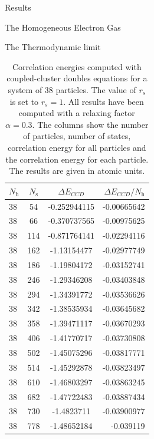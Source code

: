 \documentclass[twoside,english]{uiofysmaster}
\begin{document}
\begin{chapter}{Results}
\begin{section}{The Homogeneous Electron Gas}
\begin{subsection}{The Thermodynamic limit}
			\begin{table}[H]
				\begin{center}
					\begin{tabular}[center]{l c  c r}
						$N_{\text{h}}$ & $N_{\text{s}}$ & $\Delta E_{CCD}$ & $\Delta E_{CCD}/N_{\text{h}}$ \\
						\hline
						38 &  54 & -0.252944115 & -0.00665642\\
						38 &  66 & -0.370737565 & -0.00975625\\
						38 & 114 & -0.871764141 & -0.02294116\\
						38 & 162 & -1.13154477  & -0.02977749\\
						38 & 186 & -1.19804172  & -0.03152741\\
						38 & 246 & -1.29346208  & -0.03403848\\
						38 & 294 & -1.34391772  & -0.03536626\\
						38 & 342 & -1.38535934  & -0.03645682\\
						38 & 358 & -1.39471117  & -0.03670293\\
						38 & 406 & -1.41770717  & -0.03730808\\
						38 & 502 & -1.45075296  & -0.03817771\\
						38 & 514 & -1.45292878  & -0.03823497\\
						38 & 610 & -1.46803297  & -0.03863245\\
						38 & 682 & -1.47722483  & -0.03887434 \\
						38 & 730 & -1.4823711   & -0.03900977\\
						38 & 778 & -1.48652184  & -0.039119
					\end{tabular}
				\end{center}
				\caption{Correlation energies computed with coupled-cluster doubles equations for a system of $38$ particles. The value of $r_s$ is set to $r_s=1$. All results have been computed with a relaxing factor $\alpha=0.3$. The columns show the number of particles, number of states, correlation energy for all particles and the correlation energy for each particle. The results are given in atomic units.}
				\label{table:ThermodynamicLimit2}
			\end{table}


\end{subsection}
\end{section}
\end{chapter}
\end{document}
